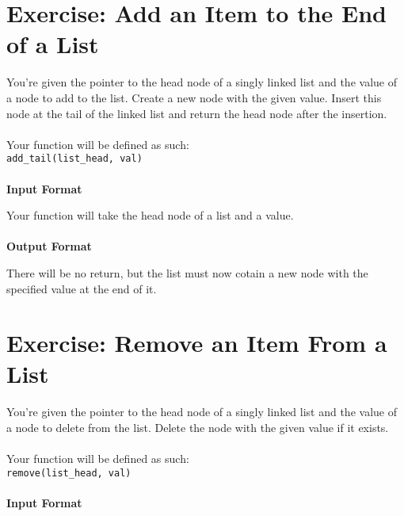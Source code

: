 \documentclass{42-en}
\begin{document}
\chapter{Exercise\exercicenumber: Add an Item to the End of a List}

\exnumber{\exercicenumber}

\makeheaderfiles
    You're given the pointer to the head node of a singly linked list and
    the value of a node to add to the list. Create a new node with the given
    value. Insert this node at the tail of the linked list and return the head
    node after the insertion.\\
    \\
    Your function will be defined as such:\\
    \texttt{add\_tail(list\_head, val)}\\
    \\
    \textbf{Input Format}

    Your function will take the head node of a list and a value.\\
    \\
    \textbf{Output Format}

    There will be no return, but the list must now cotain a new node with the specified value at the end of it.

\nextexercice

\chapter{Exercise\exercicenumber: Remove an Item From a List}

\exnumber{\exercicenumber}

\makeheaderfiles
    You're given the pointer to the head node of a singly linked list and
    the value of a node to delete from the list. Delete the node with the given
    value if it exists.\\
    \\
    Your function will be defined as such:\\
    \texttt{remove(list\_head, val)}\\
    \\
    \textbf{Input Format}
\end{document}
